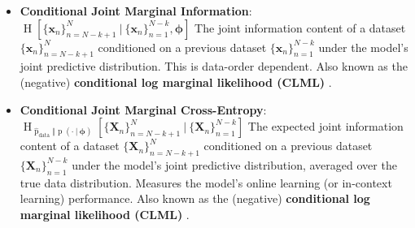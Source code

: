 \documentclass[25pt,a0paper,landscape]{tikzposter}
\newcommand{\MidSymbol}[1][]{\:#1\:}
\newcommand{\given}{\MidSymbol[\vert]}
\DeclareMathOperator{\opEntropy}{H}
\newcommand{\Hof}[1]{\opEntropy[#1]}
\newcommand{\iCrossEntropy}[3]{\opEntropy_{#1 \Vert #2}[#3]}
\DeclareMathOperator{\opp}{p}
\newcommand{\pof}[1]{\opp(#1)}
\newcommand{\h}{\boldsymbol{\phi}}
\newcommand{\XNsetk}{\{\X_n\}_{n=N-k+1}^N}
\newcommand{\xNsetk}{\{\x_n\}_{n=N-k+1}^N}
\newcommand{\XNkset}{\{\X_n\}_{n=1}^{N-k}}
\newcommand{\xNkset}{\{\x_n\}_{n=1}^{N-k}}
\newcommand{\x}{\boldsymbol{x}}
\newcommand{\X}{\boldsymbol{X}}
\newcommand{\oppdata}{\hat{\opp}_{\text{data}}}
\begin{document}
\begin{columns}
{\begin{theorybox}[title=Information Quantities]
\begin{itemize}
        \item \textbf{Conditional Joint Marginal Information}: $\Hof{\xNsetk \given \xNkset, \h}$
        The joint information content of a dataset $\xNsetk$ conditioned on a previous dataset $\xNkset$ under the model's joint predictive distribution. This is data-order dependent. Also known as the (negative) \textbf{conditional log marginal likelihood (CLML)} \citep[main paper]{lotfi2022bayesian}.
        \item \textbf{Conditional Joint Marginal Cross-Entropy}: $\iCrossEntropy{\oppdata}{\pof{\cdot \given \h}}{\XNsetk \given \XNkset}$
        The expected joint information content of a dataset $\XNsetk$ conditioned on a previous dataset $\XNkset$ under the model's joint predictive distribution, averaged over the true data distribution. Measures the model's online learning (or in-context learning) performance. Also known as the (negative) \textbf{conditional log marginal likelihood (CLML)} \citep[appendix]{lotfi2022bayesian}.
      \end{itemize}
    \end{theorybox}
  }
\end{columns}
\end{document}
